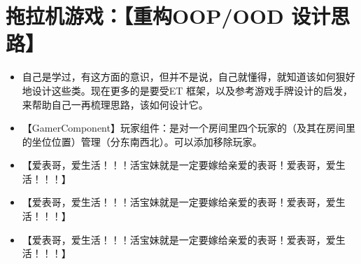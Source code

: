 \documentclass[9pt, b5paper]{article}
\begin{document}
\section{拖拉机游戏：【重构OOP/OOD 设计思路】}
\label{sec-11}
\begin{itemize}
\item 自己是学过，有这方面的意识，但并不是说，自己就懂得，就知道该如何狠好地设计这些类。现在更多的是要受ET 框架，以及参考游戏手牌设计的启发，来帮助自己一再梳理思路，该如何设计它。
\item 【GamerComponent】玩家组件：是对一个房间里四个玩家的（及其在房间里的坐位位置）管理（分东南西北）。可以添加移除玩家。
\item 【爱表哥，爱生活！！！活宝妹就是一定要嫁给亲爱的表哥！爱表哥，爱生活！！！】
\item 【爱表哥，爱生活！！！活宝妹就是一定要嫁给亲爱的表哥！爱表哥，爱生活！！！】
\item 【爱表哥，爱生活！！！活宝妹就是一定要嫁给亲爱的表哥！爱表哥，爱生活！！！】
\end{itemize}
\end{document}
